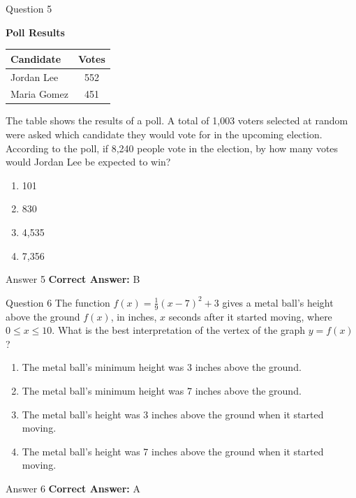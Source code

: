 \documentclass{beamer}
\begin{document}
\begin{frame}{Question 5}
\small
\begin{center}
\textbf{Poll Results}

\begin{tabular}{|l|c|}
\hline
Candidate & Votes \\
\hline
Jordan Lee & 552 \\
Maria Gomez & 451 \\
\hline
\end{tabular}
\end{center}

The table shows the results of a poll. A total of 1,003 voters selected at random were asked which candidate they would vote for in the upcoming election.  
According to the poll, if 8,240 people vote in the election, by how many votes would Jordan Lee be expected to win?
\vspace{0.35cm}
\begin{enumerate}
    \item[A.] 101
    \item[B.] 830
    \item[C.] 4,535
    \item[D.] 7,356
\end{enumerate}
\end{frame}
\begin{frame}{Answer 5}
\small
\textbf{Correct Answer:} B
\end{frame}

\begin{frame}{Question 6}
\small
The function $f(x) = \frac{1}{9}(x - 7)^2 + 3$ gives a metal ball's height above the ground $f(x)$, in inches, $x$ seconds after it started moving, where $0 \leq x \leq 10$.  
What is the best interpretation of the vertex of the graph $y = f(x)$?
\vspace{0.35cm}
\begin{enumerate}
    \item[A.] The metal ball's minimum height was 3 inches above the ground.
    \item[B.] The metal ball's minimum height was 7 inches above the ground.
    \item[C.] The metal ball’s height was 3 inches above the ground when it started moving.
    \item[D.] The metal ball’s height was 7 inches above the ground when it started moving.
\end{enumerate}
\end{frame}
\begin{frame}{Answer 6}
\small
\textbf{Correct Answer:} A
\end{frame}
\end{document}
